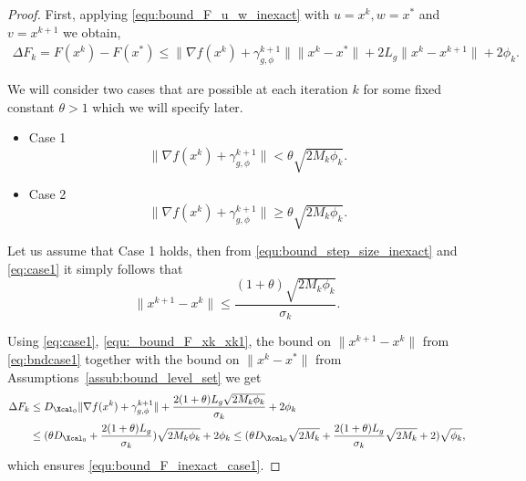 \documentclass[11pt]{article}
\numberwithin{equation}{section}
\begin{document}
\begin{proof}	      
First, applying \eqref{equ:bound_F_u_w_inexact} with $u = x^k, w = x^*$ and $v = x^{k+1}$  we obtain,
	\begin{align}
	\label{equ:_bound_F_xk_xk1}
	    \Delta F_k = F(x^k) - F(x^*)
	    \leq \|\nabla f(x^k)+\gamma_{g, \phi}^{k+1}\|\|x^k-x^*\| + 2L_g \|x^k-x^{k+1}\| + 2\phi_k. 
	\end{align}          
	
	We will consider two cases that are possible at each iteration $k$ for some fixed constant $\theta>1$ which we will specify later. 
	\begin{itemize}
	\item{Case 1} 
	\begin{equation}\label{eq:case1}
		\|  \nabla f(x^k) + \gamma_{g, \phi}^{k+1} \| < \theta\sqrt{2M_k\phi_k}.
	\end{equation}

	\item{Case 2}
	\begin{equation}\label{eq:case2}
		\| \nabla f(x^k) + \gamma_{g, \phi}^{k+1} \| \geq \theta \sqrt{2M_k\phi_k}.
	\end{equation}

	\end{itemize}

	Let us assume that Case 1 holds, then from \eqref{equ:bound_step_size_inexact}  and \eqref{eq:case1} it simply 
	follows that
	\begin{equation}\label{eq:bndcase1} 
		\| x^{k+1} - x^k\|\leq \frac{(1+\theta)\sqrt{2M_k\phi_k}}{\sigma_k}.
	\end{equation}

	

	Using \eqref{eq:case1}, \eqref{equ:_bound_F_xk_xk1}, the bound on  $\| x^{k+1} - x^k\|$ from \eqref{eq:bndcase1} together with the bound on $\|x^{k} - x^*\|$ from Assumptions~\ref{assub:bound_level_set} we get
	\begin{align}\label{eq:phi_k_replaced}
	    \Delta F_k
	    &\leq D_{\Xcal_0} \|\nabla f(x^k)+\gamma_{g, \phi}^{k+1}\| +  \frac{2(1+\theta)L_g\sqrt{2M_k\phi_k}}{\sigma_k} +2 \phi_k \\
	    \nonumber &\leq (\theta D_{\Xcal_0}+  \frac{2(1+\theta)L_g}{\sigma_k})\sqrt{2M_k\phi_k} + 2\phi_k 
	    \leq (\theta D_{\Xcal_0}\sqrt{2M_k}+  \frac{2(1+\theta)L_g}{\sigma_k}\sqrt{2M_k} + 2) \sqrt{\phi_k},
	\end{align}
	  which ensures \eqref{equ:bound_F_inexact_case1}. 
	  

\end{proof}
\end{document}
